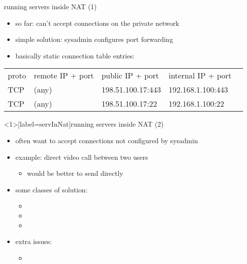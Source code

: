 \begin{frame}{running servers inside NAT (1)}
    \begin{itemize}
    \item so far: can't accept connections on the private network
    \vspace{.5cm}
    \item simple solution: sysadmin configures port forwarding
    \item basically static connection table entries:
    \end{itemize}
\begin{tabular}{l|l|l|l|l}
proto & remote IP + port & public IP  + port & internal IP + port \\
TCP & (any) & 198.51.100.17:443 & 192.168.1.100:443 \\ 
TCP & (any) & 198.51.100.17:22 & 192.168.1.100:22 \\ 
\end{tabular}
\end{frame}

\begin{frame}<1>[label=servInNat]{running servers inside NAT (2)}
    \begin{itemize}
    \item often want to accept connections not configured by sysadmin
    \item example: direct video call between two users
        \begin{itemize}
        \item would be better to send directly
        \end{itemize}
    \vspace{.5cm}
    \item some classes of solution:
        \begin{itemize}
        \item {}
        \item {}
        \item {}
        \end{itemize}
    \item extra issues:
        \begin{itemize}
        \item {}
        \end{itemize}
    \end{itemize}
\end{frame}

